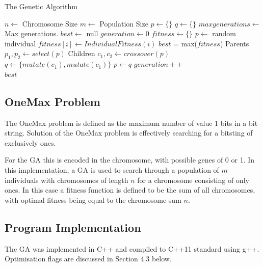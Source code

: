 \documentclass{report}
\begin{document}
\begin{algorithm}[H]
\caption{The Genetic Algorithm}\label{alg:cap}
\begin{algorithmic}

\State $n \gets $ Chromosome Size
\State $m \gets $ Population Size
\State $p \gets \lbrace\rbrace$  
\State $q \gets \lbrace\rbrace$  
\State $maxgenerations \gets $ Max generations.
\State $best \gets $ null
\State $generation \gets 0$ 
\State $fitness \gets \lbrace\rbrace$ 
	\State $p \gets$ random individual 
\EndFor
{}
	\State $fitness[i] \gets IndividualFitness(i)$
\EndFor
\State $best$ = max($fitness$)
\State Parents $p_1, p_2\gets select(p)$ 
\State Children $c_1, c_2\gets crossover(p)$ 
\State  $q\gets \lbrace mutate(c_1),mutate(c_1)\rbrace$ 
\EndFor
\State  $p\gets q$
\State $generation++$
\EndWhile \\
\Return $best$
\end{algorithmic}
\end{algorithm}


\subsection{OneMax Problem}
The OneMax problem is defined as the maximum number of value 1 bits in a bit string. Solution of the OneMax problem is effectively searching for a bitsting of exclusively ones. 

For the GA this is encoded in the chromosome, with possible genes of 0 or 1. In this implementation, a GA is used to search through a population of \(m\) individuals with chromosomes of length \(n\) for a chromosome consisting of only ones. In this case a fitness function is defined to be the sum of all chromosomes, with optimal fitness being equal to the chromosome sum \(n\).

\subsection{Program Implementation}
\label{progimp}
The GA was implemented in C++ and compiled to C++11 standard using g++. Optimisation flags are discussed in Section 4.3 below.
\end{document}
